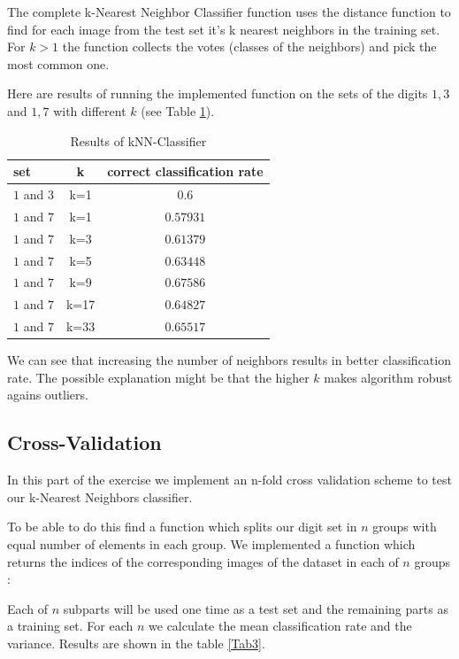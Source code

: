 \documentclass{article}
\begin{document}
The complete k-Nearest Neighbor Classifier function uses the distance function to find for each image from the test set it's k nearest neighbors in the training set. For $k>1$ the function collects the votes (classes of the neighbors) and pick the most common one.



Here are results of running the implemented function on the sets of the digits $1, 3$ and $1,7$ with different $k$ (see Table \ref{Tab2}).

\begin{table}[htb]
	\centering
	\begin{tabular}{|l|c|c|}
		\hline
		set & k & correct classification rate\\ \hline
		$1$ and $3$ & k=1 & $0.6$\\ \hline
		$1$ and $7$ & k=1 & $0.57931$\\ 
		$1$ and $7$ & k=3 & $0.61379$\\ 
		$1$ and $7$ & k=5 & $0.63448$\\ 
		$1$ and $7$ & k=9 & $0.67586$\\ 
		$1$ and $7$ & k=17 & $0.64827$ \\ 						
		$1$ and $7$ & k=33 & $0.65517$\\ \hline		
	\end{tabular}
\caption{Results of kNN-Classifier}
\label{Tab2}
\end{table}

We can see that increasing the number of neighbors results in better classification rate. The possible explanation might be that the higher $k$ makes algorithm robust agains outliers. 

\subsection{Cross-Validation}
 In this part of the exercise we implement an n-fold cross validation scheme to test our k-Nearest Neighbors classifier.

To be able to do this find a function which splits our digit set in $n$ groups with equal number of elements in each group.
We implemented a function which returns the indices of the corresponding images of the dataset in each of $n$ groups :
 


Each of $n$ subparts will be used one time as a test set and the remaining parts as a training set. For each $n$ we calculate the mean classification rate and the variance. Results are shown in the table \ref{Tab3}.
\end{document}
